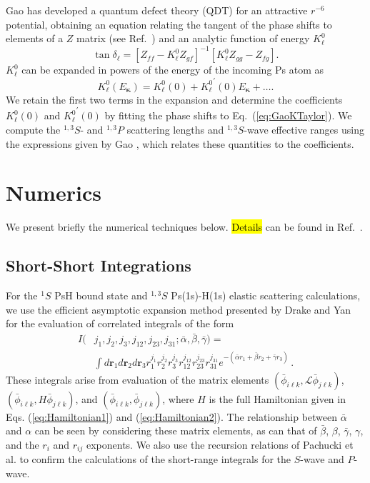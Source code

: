 \documentclass[preprint,showpacs,showkeys,preprintnumbers,amsmath,amssymb,longbibliography,pra,aps]{revtex4-1}
\begin{document}
{Gao \cite{Gao1998} has developed a quantum defect theory (QDT)
for an attractive $r^{-6}$ potential, obtaining an equation relating
the tangent of the phase shifts to elements of a $Z$ matrix
(see Ref.~\cite{Gao1998}) and an analytic function of energy $K_\ell^0$
\cite{Gao1998a}
\begin{equation}
\label{eq:GaoZEqn}
\tan\delta_\ell = [Z_{ff} - K_\ell^0 Z_{gf}]^{-1}
  [K_\ell^0 Z_{gg} - Z_{fg}].
\end{equation}
$K_\ell^0$ can be expanded in powers of the energy \cite{Gao1998a} of the
incoming Ps atom as
\begin{equation}
\label{eq:GaoKTaylor}
K_\ell^0(E_{\bm \kappa}) = K_\ell^0(0) + {K_\ell^0}^\prime(0) E_{\bm \kappa}
  + \ldots.
\end{equation}
We retain the first two terms in the expansion and determine the coefficients
$K_\ell^0(0)$ and ${K_\ell^0}^\prime(0)$ by fitting the phase shifts to
Eq.~(\ref{eq:GaoKTaylor}). We compute the $^{1,3}S$- and $^{1,3}P$ scattering
lengths and $^{1,3}S$-wave effective ranges using the expressions
given by Gao \cite{Gao1998a}, which relates these quantities to the
coefficients.


\section{Numerics}
\label{sec:Numerical}

We present briefly the numerical techniques below. \hl{Details}
can be found in Ref.~\cite{WoodsDiss2015}.

\subsection{Short-Short Integrations}
\label{sec:ShortInt}
For the $^1S$ PsH bound state and $^{1,3}S$ Ps(1s)-H(1s) elastic scattering
calculations, we use
the efficient asymptotic expansion method presented by Drake and Yan
\cite{Drake1995} for the evaluation of correlated integrals of the form
\begin{align}
\label{eq:ShortInt}
I(&j_1,j_2,j_3,j_{12},j_{23},j_{31}; \bar{\alpha}, \bar{\beta}, \bar{\gamma}) =
  \nonumber \\
&\int
d \textbf{r}_1 d \textbf{r}_2 d \textbf{r}_3
r_1^{j_1} r_2^{j_2} r_3^{j_3} r_{12}^{j_{12}}
r_{23}^{j_{23}} r_{31}^{j_{31}}
e^{-(\bar{\alpha} r_1 + \bar{\beta} r_2 + \bar{\gamma} r_3)}\, .
\end{align}
These integrals arise from evaluation of the matrix elements
$(\bar{\phi}_{i\ell k}, \mathcal{L} \bar{\phi}_{j\ell k})$,
$(\bar{\phi}_{i\ell k}, H \bar{\phi}_{j\ell k})$,
and $(\bar{\phi}_{i\ell k}, \bar{\phi}_{j\ell k})$, where $H$
is the full Hamiltonian given in Eqs. (\ref{eq:Hamiltonian1}) and
(\ref{eq:Hamiltonian2}).
The relationship between $\bar{\alpha}$ and $\alpha$ can be seen by
considering these matrix elements, as can that of $\bar{\beta}$, $\beta$,
$\bar{\gamma}$, $\gamma$, and the $r_i$ and $r_{ij}$ exponents.
We also use the recursion relations of Pachucki
et al. \cite{Pachucki2004} to confirm the calculations of the short-range 
integrals for the $S$-wave and $P$-wave.

}
\end{document}
